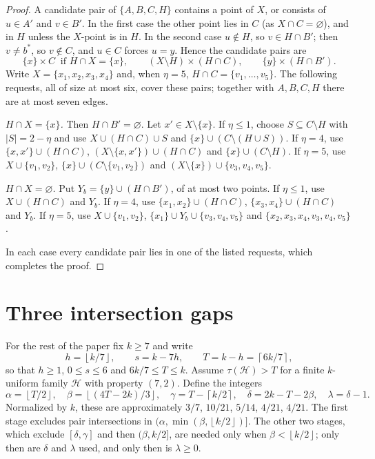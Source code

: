 \documentclass[11pt]{article}
\numberwithin{equation}{section}
\theoremstyle{definition}
\theoremstyle{remark}
\newcommand{\HH}{\mathcal H}
\newcommand{\ceil}[1]{\left\lceil #1\right\rceil}
\newcommand{\floor}[1]{\left\lfloor #1\right\rfloor}
\begin{document}
\begin{proof}
A candidate pair of $\{A,B,C,H\}$ contains a point of $X$, or consists of
$u\in A'$ and $v\in B'$. In the first case the other point lies in $C$
(as $X\cap C=\varnothing$), and in $H$ unless the $X$-point is in $H$. In
the second case $u\notin H$, so $v\in H\cap B'$; then $v\ne b^*$, so
$v\notin C$, and $u\in C$ forces $u=y$. Hence the candidate pairs are
\[
 \{x\}\times C\ \text{ if } H\cap X=\{x\},\qquad
 (X\setminus H)\times(H\cap C),\qquad \{y\}\times(H\cap B').
\]
Write $X=\{x_1,x_2,x_3,x_4\}$ and, when $\eta=5$,
$H\cap C=\{v_1,\dots,v_5\}$. The following requests, all of size at most
six, cover these pairs; together with $A,B,C,H$ there are at most seven
edges.

\emph{$H\cap X=\{x\}$.} Then $H\cap B'=\varnothing$. Let $x'\in X\setminus\{x\}$.
If $\eta\le1$, choose $S\subseteq C\setminus H$ with $|S|=2-\eta$ and use
$X\cup(H\cap C)\cup S$ and $\{x\}\cup(C\setminus(H\cup S))$. If $\eta=4$, use
$\{x,x'\}\cup(H\cap C)$, $(X\setminus\{x,x'\})\cup(H\cap C)$ and
$\{x\}\cup(C\setminus H)$. If $\eta=5$, use $X\cup\{v_1,v_2\}$,
$\{x\}\cup(C\setminus\{v_1,v_2\})$ and $(X\setminus\{x\})\cup\{v_3,v_4,v_5\}$.

\emph{$H\cap X=\varnothing$.} Put $Y_b=\{y\}\cup(H\cap B')$, of at most two
points. If $\eta\le1$, use $X\cup(H\cap C)$ and $Y_b$. If $\eta=4$, use
$\{x_1,x_2\}\cup(H\cap C)$, $\{x_3,x_4\}\cup(H\cap C)$ and $Y_b$. If
$\eta=5$, use $X\cup\{v_1,v_2\}$, $\{x_1\}\cup Y_b\cup\{v_3,v_4,v_5\}$ and
$\{x_2,x_3,x_4,v_3,v_4,v_5\}$.

In each case every candidate pair lies in one of the listed requests,
which completes the proof.
\end{proof}

\section{Three intersection gaps}\label{sec:gaps}

For the rest of the paper fix $k\ge7$ and write
\[
 h=\floor{k/7},\qquad s=k-7h,\qquad T=k-h=\ceil{6k/7},
\]
so that $h\ge1$, $0\le s\le6$ and $6k/7\le T\le k$. Assume
$\tau(\HH)>T$ for a finite $k$-uniform family $\HH$ with property
$(7,2)$. Define the integers
\begin{equation}\label{eq:endpoints}
 \alpha=\floor{T/2},\quad \beta=\floor{(4T-2k)/3},\quad
 \gamma=T-\ceil{k/2},\quad \delta=2k-T-2\beta,\quad \lambda=\delta-1.
\end{equation}
Normalized by $k$, these are approximately $3/7$, $10/21$, $5/14$,
$4/21$, $4/21$. The first stage excludes pair intersections in
$(\alpha,\min(\beta,\floor{k/2})]$. The other two stages, which exclude
$[\delta,\gamma]$ and then $(\beta,k/2]$, are needed only when
$\beta<\floor{k/2}$; only then are $\delta$ and $\lambda$ used, and only
then is $\lambda\ge0$.
\end{document}
